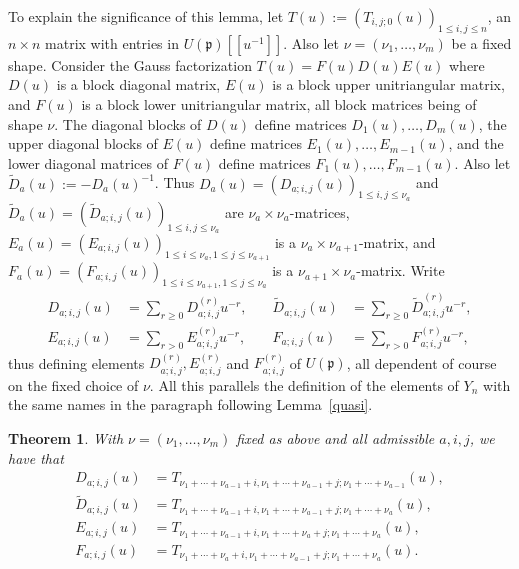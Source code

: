 \documentclass[twoside,12pt,reqno]{amsart}
\newtheorem{Theorem}[Proposition]{Theorem}
\begin{document}
To explain the significance of this lemma, 
let $T(u) := (T_{i,j;0}(u))_{1 \leq i,j \leq n}$,
an $n \times n$ matrix with entries in $U(\mathfrak{p})[[u^{-1}]]$.
Also let $\nu = (\nu_1,\dots,\nu_m)$ be a fixed shape.
Consider the Gauss factorization
$T(u) = F(u)D(u)E(u)$ where $D(u)$ is a block diagonal matrix,
$E(u)$ is a block upper unitriangular matrix, and $F(u)$ is a block
lower unitriangular matrix, all block matrices being of shape $\nu$.
The diagonal blocks of $D(u)$ define
matrices $D_1(u),\dots,D_m(u)$, 
the upper diagonal blocks
of $E(u)$ define matrices $E_1(u),\dots,E_{m-1}(u)$,
and the lower diagonal matrices of $F(u)$ define matrices
$F_1(u),\dots,F_{m-1}(u)$.
Also let $\widetilde{D}_a(u) := -D_a(u)^{-1}$.
Thus $D_a(u) = (D_{a;i,j}(u))_{1 \leq i,j \leq \nu_a}$
and $\widetilde{D}_a(u) = (\widetilde{D}_{a;i,j}(u))_{1 \leq i,j \leq \nu_a}$
are $\nu_a \times \nu_a$-matrices,
$E_a(u) = (E_{a;i,j}(u))_{1 \leq i \leq \nu_a, 1 \leq j \leq \nu_{a+1}}$
is a $\nu_a \times \nu_{a+1}$-matrix, and
$F_a(u) = (F_{a;i,j}(u))_{1 \leq i \leq \nu_{a+1}, 1 \leq j \leq \nu_{a}}$
is a $\nu_{a+1} \times \nu_{a}$-matrix.
Write
\begin{align*}
D_{a;i,j}(u) &= \sum_{r \geq 0} D_{a;i,j}^{(r)} u^{-r},\quad
&\widetilde{D}_{a;i,j}(u) &= \sum_{r \geq 0} 
\widetilde{D}_{a;i,j}^{(r)} u^{-r},\\
E_{a;i,j}(u) &= \sum_{r > 0} E_{a;i,j}^{(r)} u^{-r},\quad
&F_{a;i,j}(u) &= \sum_{r > 0} F_{a;i,j}^{(r)} u^{-r},
\end{align*}
thus defining elements $D_{a;i,j}^{(r)}, E_{a;i,j}^{(r)}$
and $F_{a;i,j}^{(r)}$ of $U(\mathfrak{p})$, 
all dependent of course on the fixed choice of $\nu$.
All this
parallels the definition
of the elements of $Y_n$ with the same names 
in the paragraph following Lemma~\ref{quasi}.

\begin{Theorem}\label{transtheorem}
With $\nu = (\nu_1,\dots,\nu_m)$ fixed as above and all admissible
$a,i,j$, we have that
\begin{align*}
D_{a;i,j}(u) &= T_{\nu_1+\cdots+\nu_{a-1}+i,\nu_1+\cdots+\nu_{a-1}+j;
\nu_1+\cdots+\nu_{a-1}}(u),\\
\widetilde{D}_{a;i,j}(u) &=
T_{\nu_1+\cdots+\nu_{a-1}+i,\nu_1+\cdots+\nu_{a-1}+j;
\nu_1+\cdots+\nu_a}(u),\\
E_{a;i,j}(u) &= T_{\nu_1+\cdots+\nu_{a-1}+i,\nu_1+\cdots+\nu_{a}+j;
\nu_1+\cdots+\nu_{a}}(u),\\
F_{a;i,j}(u) &= T_{\nu_1+\cdots+\nu_{a}+i,\nu_1+\cdots+\nu_{a-1}+j;
\nu_1+\cdots+\nu_{a}}(u).
\end{align*}
\end{Theorem}
\end{document}
